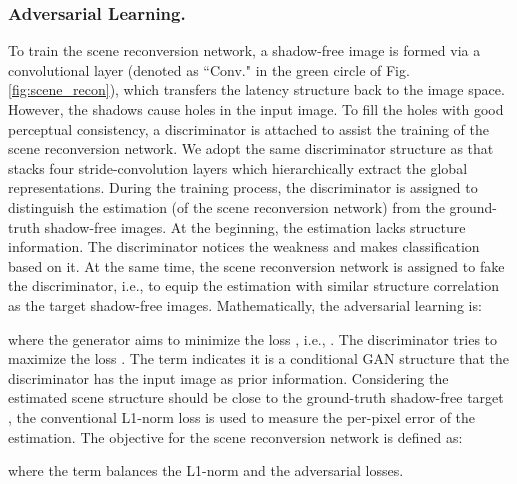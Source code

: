 \documentclass[runningheads]{llncs}
\begin{document}
\vskip -0.5cm
\baselineskip 
\subsubsection{Adversarial Learning.}
To train the scene reconversion network, a shadow-free image is formed via a convolutional layer (denoted as ``Conv." in the green circle of Fig. \ref{fig:scene_recon}), which transfers the latency structure back to the image space. However, the shadows cause holes in the input image. To fill the holes with good perceptual consistency, a discriminator is attached to assist the training of the scene reconversion network. We adopt the same discriminator structure as \cite{pix2pix} that stacks four stride-convolution layers which hierarchically extract the global representations. During the training process, the discriminator is assigned to distinguish the estimation (of the scene reconversion network) from the ground-truth shadow-free images. At the beginning, the estimation lacks structure information. The discriminator notices the weakness and makes classification based on it. At the same time, the scene reconversion network is assigned to fake the discriminator, i.e., to equip the estimation with similar structure correlation as the target shadow-free images. Mathematically, the adversarial learning is:

where the generator  aims to minimize the loss , i.e., . The discriminator  tries to maximize the loss . The term  indicates it is a conditional GAN structure that the discriminator has the input image  as prior information. Considering the estimated scene structure should be close to the ground-truth shadow-free target , the conventional L1-norm loss is used to measure the per-pixel error of the estimation. The objective for the scene reconversion network is defined as:

where the term  balances the L1-norm and the adversarial losses.

\baselineskip
\end{document}
